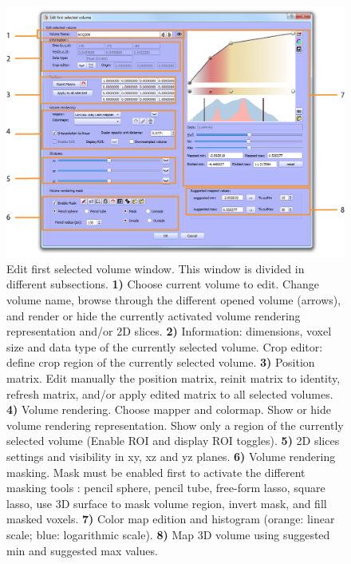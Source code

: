 \begin{figure}
  \centering
  \includegraphics[scale=0.9]{images/14/edit_volume_window.png}
\caption{Edit first selected volume window. This window is divided in different subsections. \textbf{1)} Choose current volume to edit. Change volume name, browse through the different opened volume (arrows), and render or hide the currently activated volume rendering representation and/or 2D slices.  \textbf{2)} Information: dimensions, voxel size and data type of the currently selected volume. Crop editor: define crop region of the currently selected volume. \textbf{3)} Position matrix. Edit manually the position matrix, reinit matrix to identity, refresh matrix, and/or apply edited matrix to all selected volumes. \textbf{4)} Volume rendering. Choose mapper and colormap. Show or hide volume rendering representation. Show only a region of the currently selected volume (Enable ROI and display ROI toggles). \textbf{5)} 2D slices settings and visibility in xy, xz and yz planes. \textbf{6)} Volume rendering masking. Mask must be enabled first to activate the different masking tools : pencil sphere, pencil tube, free-form lasso, square lasso, use 3D surface to mask volume region, invert mask, and fill masked voxels.  \textbf{7)} Color map edition and histogram (orange: linear scale; blue: logarithmic scale). \textbf{8)} Map 3D volume using suggested min and suggested max values.}	
\label{edit_volume_window}
 \end{figure}

